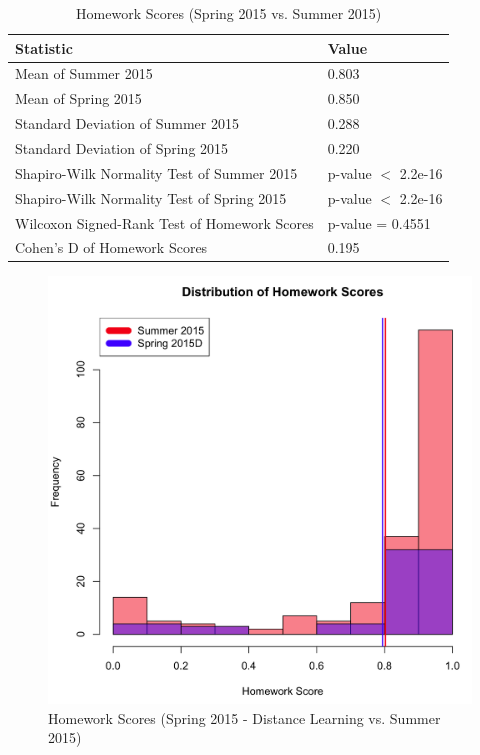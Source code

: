 \pagebreak\clearpage

\begin{small}
\begin{table}
  \centering
  \begin{tabular}{|l|l|}
    \hline
    \textbf{Statistic} & \textbf{Value} \\
	\hline
	Mean of Summer 2015 & 0.803 \\
	\hline
	Mean of Spring 2015 & 0.850 \\
	\hline
	Standard Deviation of Summer 2015 & 0.288 \\
	\hline
	Standard Deviation of Spring 2015 & 0.220 \\
	\hline
	Shapiro-Wilk Normality Test of Summer 2015 & p-value $<$ 2.2e-16 \\
	\hline
	Shapiro-Wilk Normality Test of Spring 2015 & p-value $<$ 2.2e-16 \\
	\hline
	Wilcoxon Signed-Rank Test of Homework Scores & p-value = 0.4551 \\
	\hline
	Cohen's D of Homework Scores & 0.195 \\
	\hline
  \end{tabular}
	\caption{Homework Scores (Spring 2015 vs. Summer 2015)}
  \label{fig:hwSp14Su15}
\end{table}
\end{small}

\pagebreak\clearpage

\begin{figure}
	\centering
	\includegraphics[width=5in]{img/chapter4/hw_su15_vs_sp15d}
	\caption{Homework Scores (Spring 2015 - Distance Learning vs. Summer 2015)}
  \label{fig:hwSp15dSu15}
\end{figure}

